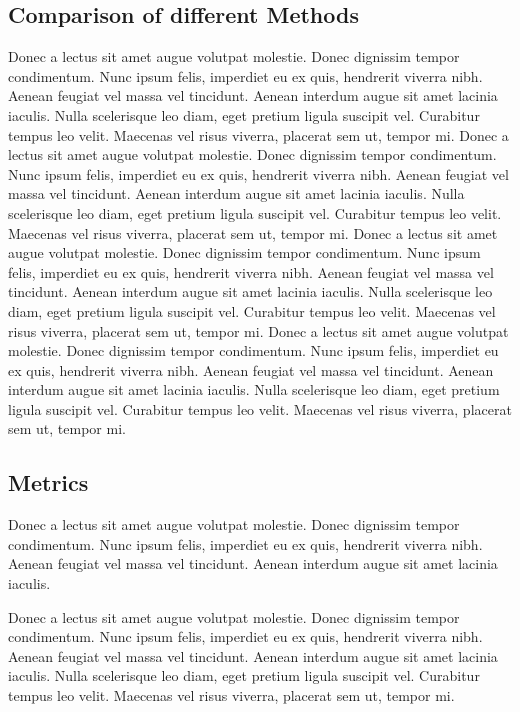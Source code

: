 \documentclass{article}
\begin{document}
\subsection{Comparison of different Methods}
Donec a lectus sit amet augue volutpat molestie. Donec dignissim tempor condimentum. Nunc ipsum felis, imperdiet
eu ex quis, hendrerit viverra nibh. Aenean feugiat vel massa vel tincidunt. Aenean interdum augue sit amet lacinia
iaculis. Nulla scelerisque leo diam, eget pretium ligula suscipit vel. 
\newpage
Curabitur tempus leo velit. Maecenas vel
risus viverra, placerat sem ut, tempor mi.
\vspace{5mm}
\newline
Donec a lectus sit amet augue volutpat molestie. Donec dignissim tempor condimentum. Nunc ipsum felis, imperdiet
eu ex quis, hendrerit viverra nibh. Aenean feugiat vel massa vel tincidunt. Aenean interdum augue sit amet lacinia
iaculis. Nulla scelerisque leo diam, eget pretium ligula suscipit vel. Curabitur tempus leo velit. Maecenas vel
risus viverra, placerat sem ut, tempor mi.
Donec a lectus sit amet augue volutpat molestie. Donec dignissim tempor condimentum. Nunc ipsum felis, imperdiet
eu ex quis, hendrerit viverra nibh. Aenean feugiat vel massa vel tincidunt. Aenean interdum augue sit amet lacinia
iaculis. Nulla scelerisque leo diam, eget pretium ligula suscipit vel. Curabitur tempus leo velit. Maecenas vel
risus viverra, placerat sem ut, tempor mi.
\vspace{5mm}
\newline
Donec a lectus sit amet augue volutpat molestie. Donec dignissim tempor condimentum. Nunc ipsum felis, imperdiet
eu ex quis, hendrerit viverra nibh. Aenean feugiat vel massa vel tincidunt. Aenean interdum augue sit amet lacinia
iaculis. Nulla scelerisque leo diam, eget pretium ligula suscipit vel. Curabitur tempus leo velit. Maecenas vel
risus viverra, placerat sem ut, tempor mi.

\subsection{Metrics}
Donec a lectus sit amet augue volutpat molestie. Donec dignissim tempor condimentum. Nunc ipsum felis, imperdiet
eu ex quis, hendrerit viverra nibh. Aenean feugiat vel massa vel tincidunt. Aenean interdum augue sit amet
lacinia iaculis.

\vspace{5mm}
Donec a lectus sit amet augue volutpat molestie. Donec dignissim tempor condimentum. Nunc ipsum felis, imperdiet
eu ex quis, hendrerit viverra nibh. Aenean feugiat vel massa vel tincidunt. Aenean interdum augue sit amet lacinia
iaculis. Nulla scelerisque leo diam, eget pretium ligula suscipit vel. Curabitur tempus leo velit. Maecenas vel
risus viverra, placerat sem ut, tempor mi.
\end{document}
